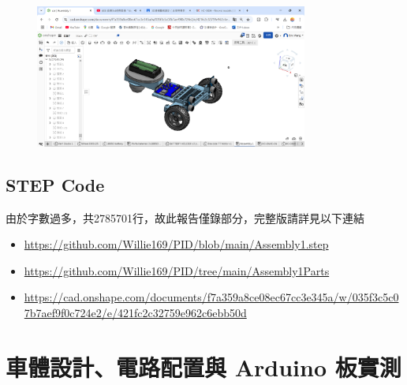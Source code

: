 \documentclass[a4paper,12pt]{article}
\begin{document}
\begin{center}\begin{figure}[H]\centering\includegraphics[width=0.8\textwidth]{./model_images/c4.png}\end{figure}\FloatBarrier\end{center}
\subsection{STEP Code}
由於字數過多，共2785701行，故此報告僅錄部分，完整版請詳見以下連結
\begin{itemize}
\item \href{https://github.com/Willie169/PID/blob/main/Assembly1.step}{https://github.com/Willie169/PID/blob/main/Assembly1.step}
\item \href{https://github.com/Willie169/PID/tree/main/Assembly1Parts}{https://github.com/Willie169/PID/tree/main/Assembly1Parts}
\item \href{https://cad.onshape.com/documents/f7a359a8ce08ec67cc3e345a/w/035f3c5c07b7aef9f0c724e2/e/421fc2c32759e962c6ebb50d}{https://cad.onshape.com/documents/f7a359a8ce08ec67cc3e345a/w/035f3c5c07b7aef9f0c724e2/e/421fc2c32759e962c6ebb50d}
\end{itemize}


\section{車體設計、電路配置與 Arduino 板實測}
\setcounter{subsection}{1}
{}

\setcounter{subsection}{2}
{}

\setcounter{subsection}{3}
{}

\setcounter{subsection}{4}
{}

\setcounter{subsection}{5}
\end{document}
